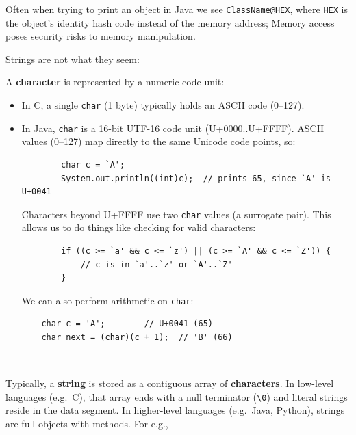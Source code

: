 \begin{Tip}
    Often when trying to print an object in Java we see \texttt{ClassName@HEX}, 
    where \texttt{HEX} is the object's identity hash code instead of the memory address; Memory access poses security risks to memory
    manipulation.
\end{Tip}

\newpage 

\noindent
Strings are not what they seem:
\begin{Def}

    \noindent
    A \textbf{character} is represented by a numeric code unit:
    \begin{itemize}
      \item In C, a single \texttt{char} (1 byte) typically holds an ASCII code (0--127).
      \item In Java, \texttt{char} is a 16-bit UTF-16 code unit (U+0000..U+FFFF). ASCII values (0--127) map directly to the same Unicode code points, so:
      \begin{verbatim}
        char c = `A';
        System.out.println((int)c);  // prints 65, since `A' is U+0041
      \end{verbatim}
      
      \vspace{-1.5em}
      \noindent
      Characters beyond U+FFFF use two \texttt{char} values (a surrogate pair). This allows us to do things like checking for 
      valid characters:
      \begin{verbatim}
        if ((c >= `a' && c <= `z') || (c >= `A' && c <= `Z')) {
            // c is in `a'..`z' or `A'..`Z'
        }
    \end{verbatim}

    \vspace{-1.5em}
    \noindent
    We can also perform arithmetic on \texttt{char}:
    \begin{verbatim}
    char c = 'A';        // U+0041 (65)
    char next = (char)(c + 1);  // 'B' (66)
    \end{verbatim}
    \end{itemize}
    
    \vspace{-1.5em}
    \noindent
    \rule{\textwidth}{0.4pt}\\ 

    \noindent
    \underline{Typically, a \textbf{string} is stored as a contiguous array of \textbf{characters}.} In low-level languages (e.g.\ C),
    that array ends with a null terminator (\verb|\0|) and literal strings reside in the data segment. 
    In higher-level languages (e.g.\ Java, Python), strings are full objects with methods. For e.g.,\\


\end{Def}
